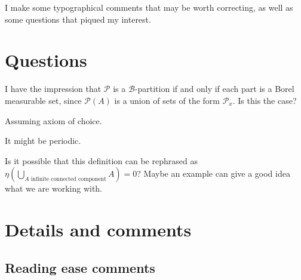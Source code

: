 \documentclass[12pt]{article}
\begin{document}
I make some typographical comments that may be worth correcting, as well as some questions that piqued my interest.

\section*{Questions}

\begin{itemize}
 I have the impression that $\mathcal P$ is a $\mathcal B$-partition if and only if each part is a Borel measurable set, since $\mathcal P(A)$ is a union of sets of the form $\mathcal P_x$. Is this the case?

Assuming axiom of choice.

It might be periodic.


Is it possible that this definition can be rephrased as $\eta(\bigcup_{A \text{ infinite connected component}} A) = 0$? Maybe an example can give a good idea what we are working with.



\end{itemize}


\section*{Details and comments}


\subsection*{Reading ease comments}
\end{document}
